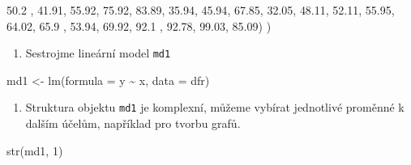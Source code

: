 \documentclass[
  letterpaper,
  DIV=11,
  numbers=noendperiod]{scrreprt}
\newenvironment{Shaded}{\begin{snugshade}}{\end{snugshade}}
\newcommand{\AttributeTok}[1]{\textcolor[rgb]{0.40,0.45,0.13}{#1}}
\newcommand{\DecValTok}[1]{\textcolor[rgb]{0.68,0.00,0.00}{#1}}
\newcommand{\FloatTok}[1]{\textcolor[rgb]{0.68,0.00,0.00}{#1}}
\newcommand{\FunctionTok}[1]{\textcolor[rgb]{0.28,0.35,0.67}{#1}}
\newcommand{\NormalTok}[1]{\textcolor[rgb]{0.00,0.23,0.31}{#1}}
\newcommand{\OtherTok}[1]{\textcolor[rgb]{0.00,0.23,0.31}{#1}}
\newcommand{\SpecialCharTok}[1]{\textcolor[rgb]{0.37,0.37,0.37}{#1}}
\providecommand{\tightlist}{%
  \setlength{\itemsep}{0pt}\setlength{\parskip}{0pt}}\usepackage{longtable,booktabs,array}
\begin{document}
\begin{Shaded}
\begin{Highlighting}[]
         \FloatTok{50.2}\NormalTok{ , }\FloatTok{41.91}\NormalTok{, }\FloatTok{55.92}\NormalTok{, }\FloatTok{75.92}\NormalTok{, }\FloatTok{83.89}\NormalTok{, }\FloatTok{35.94}\NormalTok{, }\FloatTok{45.94}\NormalTok{, }\FloatTok{67.85}\NormalTok{, }\FloatTok{32.05}\NormalTok{, }\FloatTok{48.11}\NormalTok{, }
         \FloatTok{52.11}\NormalTok{, }\FloatTok{55.95}\NormalTok{, }\FloatTok{64.02}\NormalTok{, }\FloatTok{65.9}\NormalTok{ , }\FloatTok{53.94}\NormalTok{, }\FloatTok{69.92}\NormalTok{, }\FloatTok{92.1}\NormalTok{ , }\FloatTok{92.78}\NormalTok{, }\FloatTok{99.03}\NormalTok{, }\FloatTok{85.09}\NormalTok{)}
\NormalTok{)}
\end{Highlighting}
\end{Shaded}

\begin{enumerate}
\def\labelenumi{\arabic{enumi}.}
\setcounter{enumi}{1}
\tightlist
\item
  Sestrojme lineární model \texttt{md1}
\end{enumerate}

\begin{Shaded}
\begin{Highlighting}[]
\NormalTok{md1 }\OtherTok{\textless{}{-}} \FunctionTok{lm}\NormalTok{(}\AttributeTok{formula =}\NormalTok{ y }\SpecialCharTok{\textasciitilde{}}\NormalTok{ x, }\AttributeTok{data =}\NormalTok{ dfr)}
\end{Highlighting}
\end{Shaded}

\begin{enumerate}
\def\labelenumi{\arabic{enumi}.}
\setcounter{enumi}{2}
\tightlist
\item
  Struktura objektu \texttt{md1} je komplexní, můžeme vybírat jednotlivé
  proměnné k dalším účelům, například pro tvorbu grafů.
\end{enumerate}

\begin{Shaded}
\begin{Highlighting}[]
\FunctionTok{str}\NormalTok{(md1, }\DecValTok{1}\NormalTok{)}
\end{Highlighting}
\end{Shaded}
\end{document}
